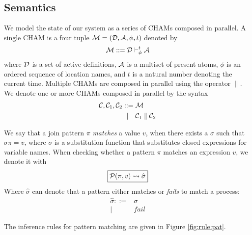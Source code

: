 \subsection{Semantics}

We model the state of our system as a series of CHAMs composed in parallel. A
single CHAM is a four tuple $\M = (\D, \A, \phi, t)$ denoted by
\begin{equation*}
 \M ::= \D \mscJ \A
\end{equation*}
where $\D$ is a set of active definitions, $\A$ is a multiset
of present atoms, $\phi$ is an ordered sequence of location names, and $t$ is
a natural number denoting the current time. Multiple CHAMs are composed in
parallel using the operator $\parallel$. We denote one or more CHAMs composed
in parallel by the syntax
\begin{align*}
 \C, \C_1, \C_2 ::={}& \M \\
             |\quad{}& \C_1 \parallel \C_2
\end{align*}

We say that a join pattern $\pi$ \emph{matches} a value $v$, when there exists
a $\sigma$ such that $\sigma \pi = v$, where $\sigma$ is a substitution
function that substitutes closed expressions for variable names.
When checking whether a pattern $\pi$ matches an expression $v$, we denote it
with
\begin{equation*}
  \boxed{\P(\pi,v) \leadsto \hat\sigma}
\end{equation*}
Where $\hat\sigma$ can denote that a pattern either matches or \emph{fails} to
match a process:
\begin{align*}
 \hat\sigma ::={}& \sigma \\
         |\quad{}& fail
\end{align*}

The inference rules for pattern matching are given in Figure \ref{fig:rule:pat}.

